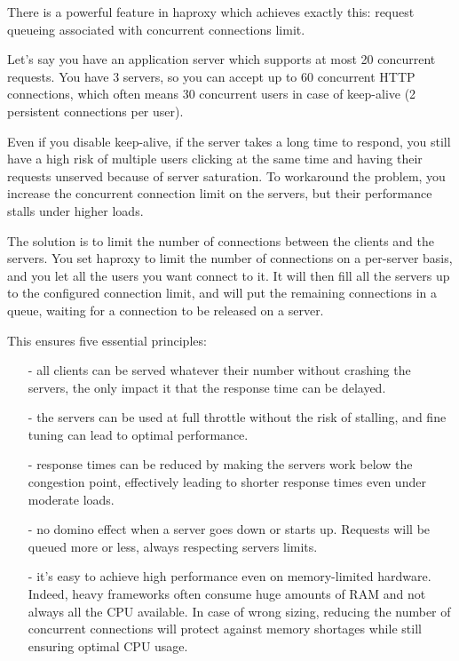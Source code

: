 There is a powerful feature in haproxy which achieves exactly this: request
queueing associated with concurrent connections limit.

Let's say you have an application server which supports at most 20 concurrent
requests. You have 3 servers, so you can accept up to 60 concurrent HTTP
connections, which often means 30 concurrent users in case of keep-alive (2
persistent connections per user).

Even if you disable keep-alive, if the server takes a long time to respond,
you still have a high risk of multiple users clicking at the same time and
having their requests unserved because of server saturation. To workaround
the problem, you increase the concurrent connection limit on the servers,
but their performance stalls under higher loads.

The solution is to limit the number of connections between the clients and the
servers. You set haproxy to limit the number of connections on a per-server
basis, and you let all the users you want connect to it. It will then fill all
the servers up to the configured connection limit, and will put the remaining
connections in a queue, waiting for a connection to be released on a server.

This ensures five essential principles:

\begin{itemize}
\item[-] all clients can be served whatever their number without crashing the
    servers, the only impact it that the response time can be delayed.

\item[-] the servers can be used at full throttle without the risk of stalling,
    and fine tuning can lead to optimal performance.

\item[-] response times can be reduced by making the servers work below the
    congestion point, effectively leading to shorter response times even
    under moderate loads.

\item[-] no domino effect when a server goes down or starts up. Requests will be
    queued more or less, always respecting servers limits.

\item[-] it's easy to achieve high performance even on memory-limited hardware.
    Indeed, heavy frameworks often consume huge amounts of RAM and not always
    all the CPU available. In case of wrong sizing, reducing the number of
    concurrent connections will protect against memory shortages while still
    ensuring optimal CPU usage.
\end{itemize}

